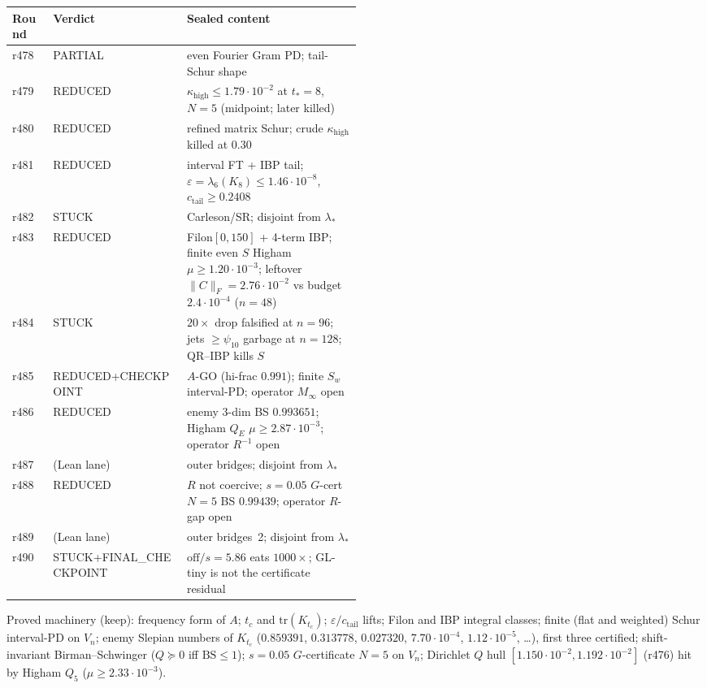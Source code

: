 \documentclass[11pt]{article}
\theoremstyle{remark}
\begin{document}
\begin{center}
\small
\begin{tabular}{@{}llp{0.50\linewidth}@{}}
\toprule
Round & Verdict & Sealed content \\
\midrule
r478 & PARTIAL
  & even Fourier Gram PD; tail-Schur shape \\
r479 & REDUCED
  & $\kappa_{\mathrm{high}}\le1.79\cdot10^{-2}$
    at $t_*=8$, $N=5$ (midpoint; later killed) \\
r480 & REDUCED
  & refined matrix Schur;
    crude $\kappa_{\mathrm{high}}$ killed at $0.30$ \\
r481 & REDUCED
  & interval FT + IBP tail;
    $\varepsilon=\lambda_6(K_8)\le1.46\cdot10^{-8}$,
    $c_{\mathrm{tail}}\ge0.2408$ \\
r482 & STUCK
  & Carleson/SR; disjoint from $\lambda_*$ \\
r483 & REDUCED
  & Filon$[0,150]$ + 4-term IBP;
    finite even $S$ Higham $\mu\ge1.20\cdot10^{-3}$;
    leftover $\|C\|_F=2.76\cdot10^{-2}$ vs budget
    $2.4\cdot10^{-4}$ ($n=48$) \\
r484 & STUCK
  & $20\times$ drop falsified at $n=96$;
    jets $\ge\psi_{10}$ garbage at $n=128$;
    QR--IBP kills $S$ \\
r485 & REDUCED+CHECKPOINT
  & $A$-GO (hi-frac $0.991$);
    finite $S_w$ interval-PD;
    operator $M_\infty$ open \\
r486 & REDUCED
  & enemy $3$-dim BS $0.993651$;
    Higham $Q_E$ $\mu\ge2.87\cdot10^{-3}$;
    operator $R^{-1}$ open \\
r487 & (Lean lane)
  & outer bridges; disjoint from $\lambda_*$ \\
r488 & REDUCED
  & $R$ not coercive;
    $s=0.05$ $G$-cert $N=5$ BS $0.99439$;
    operator $R$-gap open \\
r489 & (Lean lane)
  & outer bridges~2; disjoint from $\lambda_*$ \\
r490 & STUCK+FINAL\_CHECKPOINT
  & $\mathrm{off}/s=5.86$ eats $1000\times$;
    GL-tiny is not the certificate residual \\
\bottomrule
\end{tabular}
\end{center}

Proved machinery (keep):
frequency form of $A$;
$t_c$ and $\mathrm{tr}(K_{t_c})$;
$\varepsilon/c_{\mathrm{tail}}$ lifts;
Filon and IBP integral classes;
finite (flat and weighted) Schur interval-PD on $V_n$;
enemy Slepian numbers of $K_{t_c}$
($0.859391$, $0.313778$, $0.027320$,
$7.70\cdot10^{-4}$, $1.12\cdot10^{-5}$, \ldots),
first three certified;
shift-invariant Birman--Schwinger
($Q\succeq0$ iff $\mathrm{BS}\le1$);
$s=0.05$ $G$-certificate $N=5$ on $V_n$;
Dirichlet $Q$ hull
$[1.150\cdot10^{-2},1.192\cdot10^{-2}]$
(r476) hit by Higham $Q_5$
($\mu\ge2.33\cdot10^{-3}$).
\end{document}
